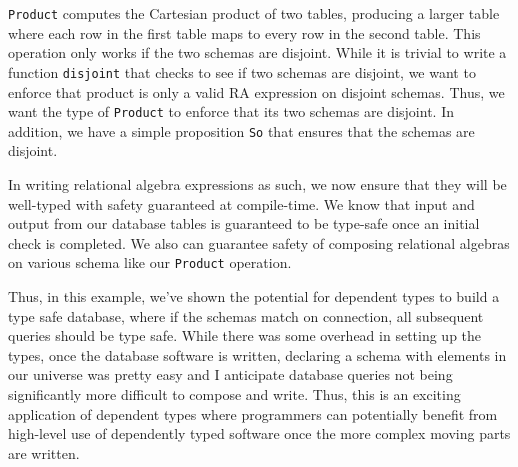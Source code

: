 \texttt{Product} computes the Cartesian product of two tables, producing a
larger table where each row in the first table maps to every row in the second
table. This operation only works if the two schemas are disjoint. While it is
trivial to write a function \texttt{disjoint} that checks to see if two schemas
are disjoint, we want to enforce that product is only a valid RA expression on
disjoint schemas. Thus, we want the type of \texttt{Product} to enforce that its
two schemas are disjoint. In addition, we have a simple proposition \texttt{So}
that ensures that the schemas are disjoint. 

In writing relational algebra expressions as such, we now ensure that they will
be well-typed with safety guaranteed at compile-time. We know that input and
output from our database tables is guaranteed to be type-safe once an initial
check is completed. We also can guarantee safety of composing relational
algebras on various schema like our \texttt{Product} operation. 

Thus, in this example, we've shown the potential for dependent types to build a
type safe database, where if the schemas match on connection, all subsequent
queries should be type safe. While there was some overhead in setting up the
types, once the database software is written, declaring a schema with elements
in our universe was pretty easy and I anticipate database queries not being
significantly more difficult to compose and write. Thus, this is an exciting
application of dependent types where programmers can potentially benefit from
high-level use of dependently typed software once the more complex moving parts
are written. 

